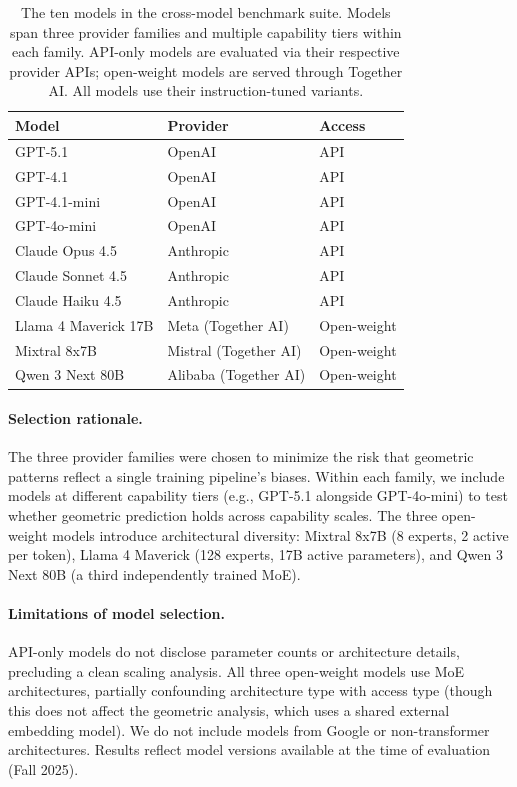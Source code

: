 \begin{table}[ht]
\centering
\small
\begin{tabular}{lll}
\toprule
\textbf{Model} & \textbf{Provider} & \textbf{Access} \\
\midrule
GPT-5.1 & OpenAI & API \\
GPT-4.1 & OpenAI & API \\
GPT-4.1-mini & OpenAI & API \\
GPT-4o-mini & OpenAI & API \\
\midrule
Claude Opus 4.5 & Anthropic & API \\
Claude Sonnet 4.5 & Anthropic & API \\
Claude Haiku 4.5 & Anthropic & API \\
\midrule
Llama 4 Maverick 17B & Meta (Together AI) & Open-weight \\
Mixtral 8x7B & Mistral (Together AI) & Open-weight \\
Qwen 3 Next 80B & Alibaba (Together AI) & Open-weight \\
\bottomrule
\end{tabular}
\caption{The ten models in the cross-model benchmark suite. Models span three provider families and multiple capability tiers within each family. API-only models are evaluated via their respective provider APIs; open-weight models are served through Together AI. All models use their instruction-tuned variants.}
\label{tab:models}
\end{table}

\paragraph{Selection rationale.} The three provider families were chosen to minimize the risk that geometric patterns reflect a single training pipeline's biases. Within each family, we include models at different capability tiers (e.g., GPT-5.1 alongside GPT-4o-mini) to test whether geometric prediction holds across capability scales. The three open-weight models introduce architectural diversity: Mixtral 8x7B (8 experts, 2 active per token), Llama 4 Maverick (128 experts, 17B active parameters), and Qwen 3 Next 80B (a third independently trained MoE).

\paragraph{Limitations of model selection.} API-only models do not disclose parameter counts or architecture details, precluding a clean scaling analysis. All three open-weight models use MoE architectures, partially confounding architecture type with access type (though this does not affect the geometric analysis, which uses a shared external embedding model). We do not include models from Google or non-transformer architectures. Results reflect model versions available at the time of evaluation (Fall 2025).

